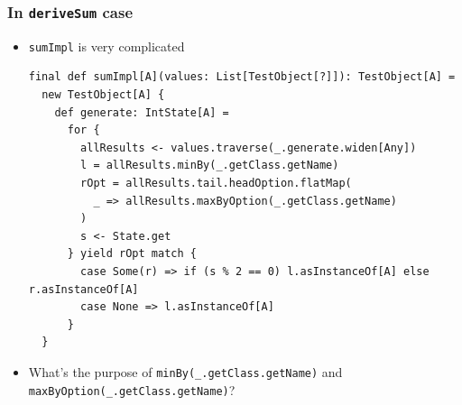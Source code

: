 \begin{frame}[fragile]
  \frametitle{ In \lstinline|deriveSum| case}

  \begin{itemize}
    \item \lstinline|sumImpl| is very complicated
\begin{lstlisting}[style=scala]
final def sumImpl[A](values: List[TestObject[?]]): TestObject[A] =
  new TestObject[A] {
    def generate: IntState[A] =
      for {
        allResults <- values.traverse(_.generate.widen[Any])
        l = allResults.minBy(_.getClass.getName)
        rOpt = allResults.tail.headOption.flatMap(
          _ => allResults.maxByOption(_.getClass.getName)
        )
        s <- State.get
      } yield rOpt match {
        case Some(r) => if (s % 2 == 0) l.asInstanceOf[A] else r.asInstanceOf[A]
        case None => l.asInstanceOf[A]
      }
  }
\end{lstlisting}

    \item What's the purpose of \lstinline|minBy(_.getClass.getName)| and \lstinline|maxByOption(_.getClass.getName)|?
  \end{itemize}

\end{frame}

